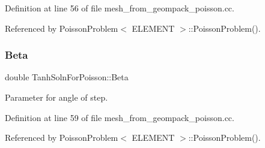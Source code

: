 Definition at line 56 of file mesh\+\_\+from\+\_\+geompack\+\_\+poisson.\+cc.



Referenced by Poisson\+Problem$<$ E\+L\+E\+M\+E\+N\+T $>$\+::\+Poisson\+Problem().

\mbox{\label{namespaceTanhSolnForPoisson_ae07364a1d73b28e5e250bda6c8954f01}} 
\subsubsection{\texorpdfstring{Beta}{Beta}}
{\footnotesize\ttfamily double Tanh\+Soln\+For\+Poisson\+::\+Beta}



Parameter for angle of step. 



Definition at line 59 of file mesh\+\_\+from\+\_\+geompack\+\_\+poisson.\+cc.



Referenced by Poisson\+Problem$<$ E\+L\+E\+M\+E\+N\+T $>$\+::\+Poisson\+Problem().

